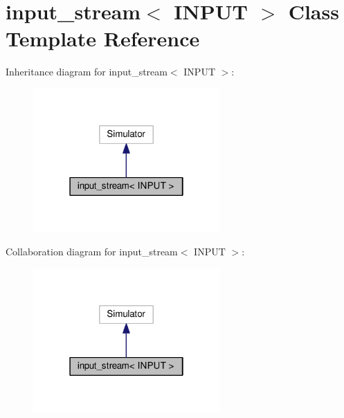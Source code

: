 \hypertarget{classinput__stream}{}\section{input\+\_\+stream$<$ I\+N\+P\+UT $>$ Class Template Reference}
\label{classinput__stream}


Inheritance diagram for input\+\_\+stream$<$ I\+N\+P\+UT $>$\+:
\nopagebreak
\begin{figure}[H]
\begin{center}
\leavevmode
\includegraphics[width=202pt]{classinput__stream__inherit__graph}
\end{center}
\end{figure}


Collaboration diagram for input\+\_\+stream$<$ I\+N\+P\+UT $>$\+:
\nopagebreak
\begin{figure}[H]
\begin{center}
\leavevmode
\includegraphics[width=202pt]{classinput__stream__coll__graph}
\end{center}
\end{figure}
